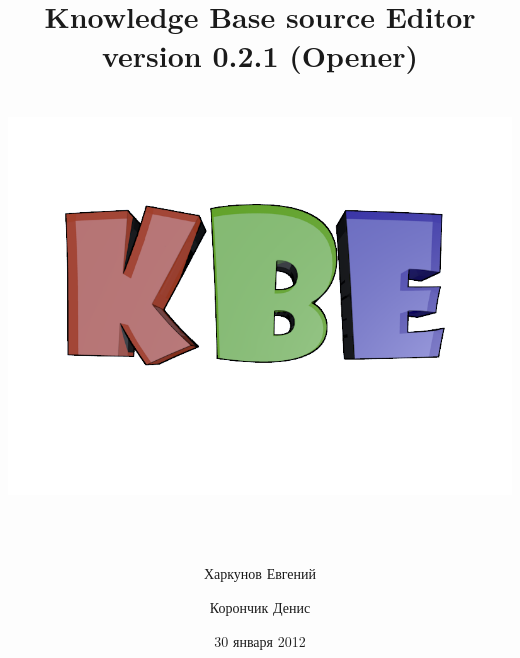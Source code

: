 \title{
	\textcolor[rgb]{.67,.05,.05}{Knowledge} \textcolor[rgb]{.23,.62,.25}{Base} source \textcolor[rgb]{.11,.45,.86}{Editor} 					\\version 0.2.1 (Opener)
	\includegraphics[width=16.30cm, height=12.22cm]{../images/title.png}
}
\author{Харкунов Евгений \and Корончик Денис}
\date{30 января 2012}
\maketitle
